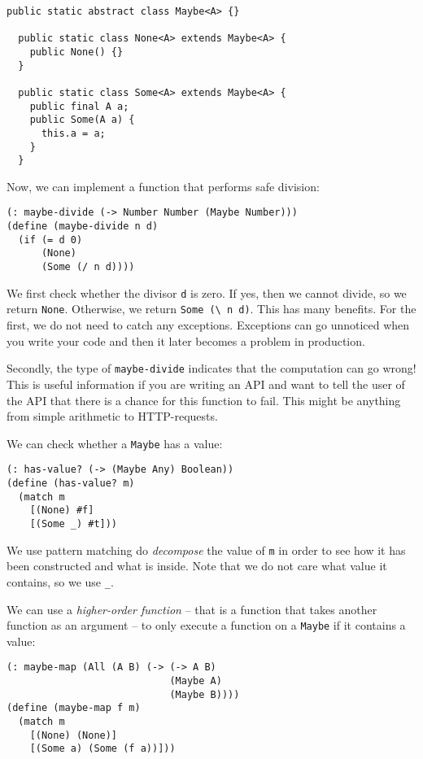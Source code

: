 \documentclass{article}
\begin{document}
\begin{lstlisting}[style=Java]
  public static abstract class Maybe<A> {}

  public static class None<A> extends Maybe<A> {
    public None() {}
  }

  public static class Some<A> extends Maybe<A> {
    public final A a;
    public Some(A a) {
      this.a = a;
    }
  }
\end{lstlisting}

Now, we can implement a function that performs safe division:

\begin{lstlisting}
(: maybe-divide (-> Number Number (Maybe Number)))
(define (maybe-divide n d)
  (if (= d 0)
      (None)
      (Some (/ n d))))
\end{lstlisting}

We first check whether the divisor \lstinline{d} is zero. If yes, then we cannot divide, so we return \lstinline{None}. Otherwise, we return \lstinline{Some (\ n d)}. This has many benefits. For the first, we do not need to catch any exceptions. Exceptions can go unnoticed when you write your code and then it later becomes a problem in production.

Secondly, the type of \lstinline{maybe-divide} indicates that the computation can go wrong! This is useful information if you are writing an API and want to tell the user of the API that there is a chance for this function to fail. This might be anything from simple arithmetic to HTTP-requests.

We can check whether a \lstinline{Maybe} has a value:

\begin{lstlisting}
(: has-value? (-> (Maybe Any) Boolean))
(define (has-value? m)
  (match m
    [(None) #f]
    [(Some _) #t]))
\end{lstlisting}

We use pattern matching do \emph{decompose} the value of \lstinline{m} in order to see how it has been constructed and what is inside. Note that we do not care what value it contains, so we use \lstinline{_}.

We can use a \emph{higher-order function} -- that is a function that takes another function as an argument -- to only execute a function on a \lstinline{Maybe} if it contains a value:

\begin{lstlisting}
(: maybe-map (All (A B) (-> (-> A B)
                            (Maybe A)
                            (Maybe B))))
(define (maybe-map f m)
  (match m
    [(None) (None)]
    [(Some a) (Some (f a))]))
\end{lstlisting}
\end{document}
